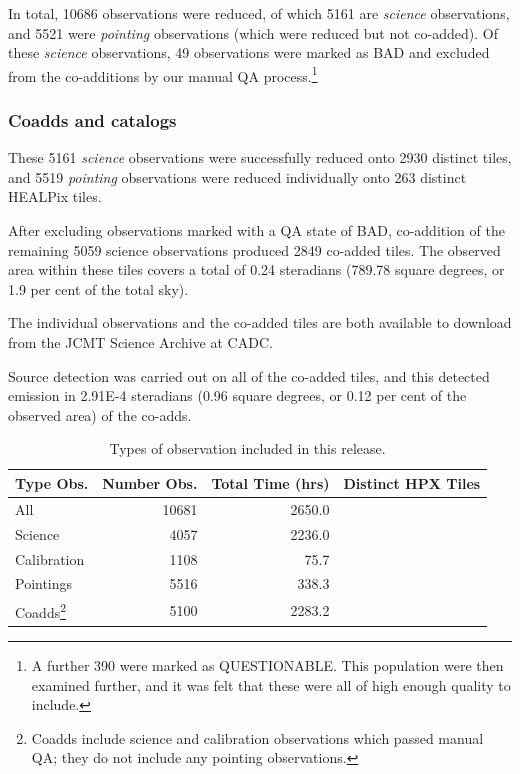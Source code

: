 \documentclass[twocolumn]{aastex6}
\newcommand{\status}[1]{\textsf{#1}}
\begin{document}
In total, 10686 observations were reduced, of which 5161 are
\emph{science} observations, and 5521 were \emph{pointing}
observations (which were reduced but not co-added).  Of these
\emph{science} observations, 49 observations were marked as
\status{BAD} and excluded from the co-additions by our manual QA
process.\footnote{A further 390 were marked as
  \status{QUESTIONABLE}. This population were then examined further,
  and it was felt that these were all of high enough quality to
  include.}

\subsubsection{Coadds and catalogs}
These 5161 \emph{science} observations were successfully reduced onto
2930 distinct tiles, and 5519 \emph{pointing} observations were
reduced individually onto 263 distinct HEALPix tiles.

After excluding observations marked with a QA state of \status{BAD},
co-addition of the remaining 5059 science observations produced 2849
co-added tiles. The observed area within these tiles covers a total of
0.24 steradians (789.78 square degrees, or 1.9 per cent of the total
sky).

The individual observations and the co-added tiles are both available
to download from the JCMT Science Archive at CADC.

Source detection was carried out on all of the co-added tiles, and this
detected emission in 2.91E-4 steradians (0.96 square degrees, or 0.12
per cent of the observed area) of the co-adds.


\begin{table}
  \begin{tabular}{l r r r}
    \hline
    Type Obs.
    &\multicolumn{1}{p{1cm}}{Number Obs.}
    &\multicolumn{1}{p{1cm}}{Total Time (hrs)}
    &\multicolumn{1}{p{1.5cm}}{Distinct HPX Tiles}\\
    \hline
    All & 10681 & 2650.0 & \\
    Science & 4057 & 2236.0 & \\
    Calibration & 1108 &75.7 & \\
    Pointings & 5516& 338.3&\\[3mm]
    Coadds\footnote{%
    Coadds include science and calibration observations which passed
    manual QA; they do not include any pointing observations.}
    &5100 &2283.2 &\\
  \end{tabular}
  \caption{Types of observation included in this release.
    \label{tab:typesobs}}
\end{table}
 
\end{document}
